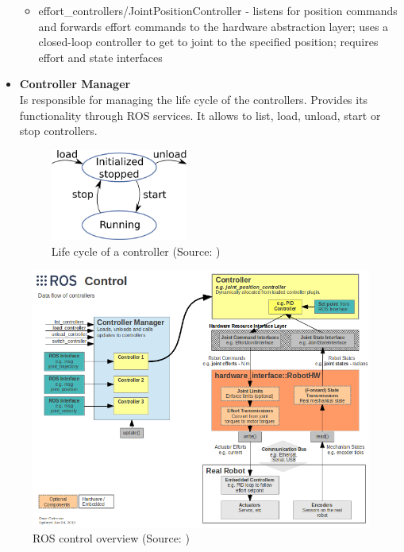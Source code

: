 \documentclass[english,inz,shortabstract]{iithesis}
\begin{document}
\begin{itemize}
\begin{itemize}
                \item \textsf{effort\_controllers/JointPositionController} - listens for position commands and forwards effort commands to the hardware abstraction layer; uses a closed-loop controller to get to joint to the specified position; requires effort and state interfaces
            \end{itemize}
        \item \textbf{Controller Manager}\\
        Is responsible for managing the life cycle of the controllers. Provides its functionality through ROS services. It allows to list, load, unload, start or stop controllers. 
        \begin{figure}[ht]
            \centering
            \includegraphics[height=3cm]{img/controller_life.png}
            \caption{Life cycle of a controller (Source: \cite{ros_control:cm_wiki})}
            \label{fig:controller_life}
        \end{figure}

    \end{itemize}

    
    \begin{figure}[ht]
        \centering
        \includegraphics[width=\textwidth]{img/ros_control.png}
        \caption{ROS control overview (Source: \cite{ros_control:wiki})}
        \label{fig:ros_control}
    \end{figure}
\end{document}
